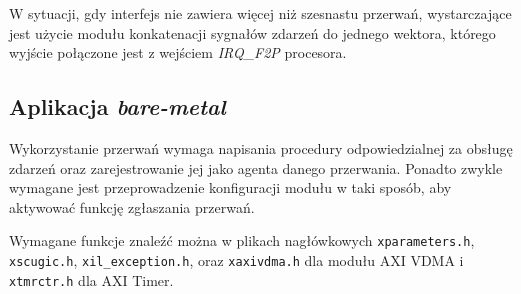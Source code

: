 W sytuacji, gdy interfejs nie zawiera więcej niż szesnastu przerwań, wystarczające jest użycie modułu konkatenacji sygnałów zdarzeń do jednego wektora, którego wyjście połączone jest z wejściem \emph{IRQ\_F2P} procesora.

\subsection{Aplikacja \textit{bare-metal}}

Wykorzystanie przerwań wymaga napisania procedury odpowiedzialnej za obsługę zdarzeń oraz zarejestrowanie jej jako agenta danego przerwania.
Ponadto zwykle wymagane jest przeprowadzenie konfiguracji modułu w taki sposób, aby aktywować funkcję zgłaszania przerwań. %

Wymagane funkcje znaleźć można w plikach nagłówkowych \texttt{xparameters.h}, \texttt{xscugic.h}, \texttt{xil\_exception.h}, oraz \texttt{xaxivdma.h} dla modułu AXI VDMA i \texttt{xtmrctr.h} dla AXI Timer.

